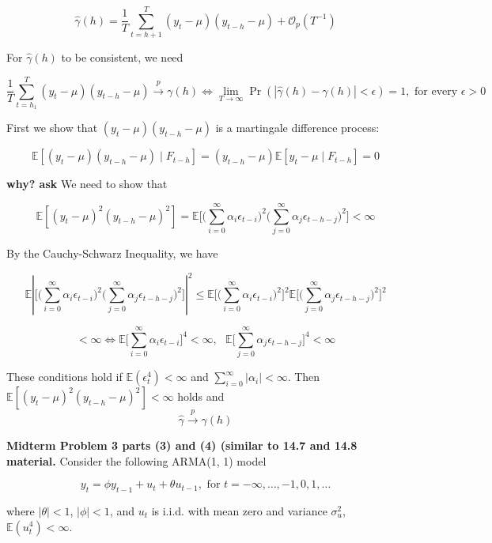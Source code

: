 \documentclass{article}
\newcommand{\E}{\mathbb{E}}
\begin{document}
\begin{enumerate}[(a)]
\[
\hat{\gamma}(h)  = \frac{1}{T} \sum_{t=h+1}^T(y_t - \mu)(y_{t-h} - \mu) + \mathcal{O}_p(T^{-1})
\]

For \(\hat{\gamma}(h)\) to be consistent, we need

\[
\frac{1}{T}\sum_{t=h_1}^T (y_t - \mu)(y_{t-h} - \mu) \xrightarrow{p} \gamma(h) \iff \lim_{T \to \infty} \Pr(|\hat{\gamma}(h)-\gamma(h)| < \epsilon) = 1, \text{ for every } \epsilon > 0
\]

First we show that \((y_t - \mu)(y_{t-h} - \mu)\) is a martingale difference process:

\[
\E[(y_t - \mu)(y_{t-h} - \mu) \mid F_{t-h}] =(y_{t-h} - \mu)  \E[y_t - \mu \mid F_{t-h}] = 0
\]

\textbf{why? ask} We need to show that

\[
\E[(y_t - \mu)^2(y_{t-h} - \mu)^2 ] = \E \bigg[ \bigg( \sum_{i=0}^\infty \alpha_i \epsilon_{t-i} \bigg)^2 \bigg( \sum_{j=0}^\infty \alpha_j \epsilon_{t - h - j} \bigg) ^2 \bigg] < \infty
\]

By the Cauchy-Schwarz Inequality, we have

\[
\E \left| \bigg[ \bigg( \sum_{i=0}^\infty \alpha_i \epsilon_{t-i} \bigg)^2 \bigg( \sum_{j=0}^\infty \alpha_j \epsilon_{t - h - j} \bigg) ^2 \bigg] \right| ^2 \leq \E \bigg[ \bigg( \sum_{i=0}^\infty \alpha_i \epsilon_{t-i} \bigg)^2\bigg]^2 \E \bigg[ \bigg( \sum_{j=0}^\infty \alpha_j \epsilon_{t - h - j} \bigg) ^2\bigg]^2
\]

\[
< \infty \iff \E \bigg[ \sum_{i=0}^\infty \alpha_i \epsilon_{t-i}\bigg]^4 < \infty, \ \ \  \E \bigg[ \sum_{j=0}^\infty \alpha_j \epsilon_{t - h - j} \bigg]^4 < \infty
\]

These conditions hold if \(\E(\epsilon_t^4) < \infty\) and \(\sum_{i=0}^\infty |\alpha_i| < \infty\). Then \(\E[(y_t - \mu)^2(y_{t-h} - \mu)^2 ] < \infty\) holds and
\[
\hat{\gamma} \xrightarrow{p} \gamma(h)
\]

\end{enumerate}

\textbf{Midterm Problem 3 parts (3) and (4) (similar to 14.7 and 14.8 material.} Consider the following ARMA(1, 1) model

\[
y_t = \phi y_{t-1} + u_t + \theta u_{t-1}, \text{ for } t = - \infty, \ldots, -1, 0 , 1, \ldots
\]

where \(|\theta| < 1\), \(|\phi| < 1\), and \(u_t\) is i.i.d. with mean zero and variance \(\sigma_u^2\), \(\E(u_t^4) < \infty\).
\end{document}
